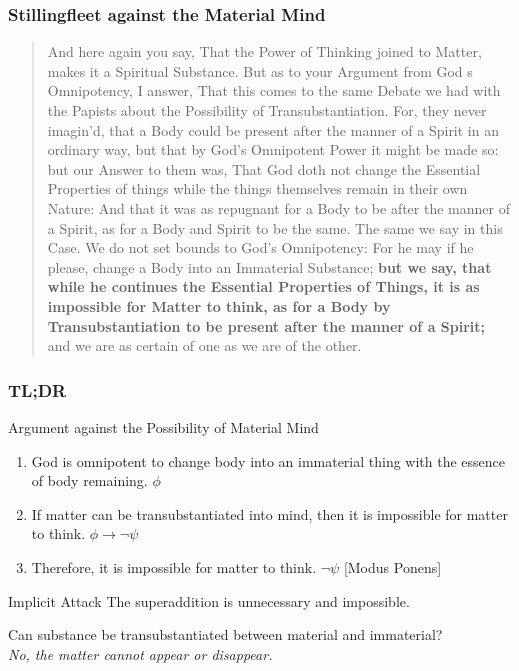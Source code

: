 \documentclass{beamer}
\begin{document}
\begin{frame}
    \frametitle{Stillingfleet against the Material Mind}
    \begin{small}
    \begin{quote}
    And here again you say, That the Power of Thinking joined to Matter, makes it a Spiritual Substance. But as to your Argument from God s Omnipotency, I answer, That this comes to the same Debate we had with the Papists about the Possibility of Transubstantiation. For, they never imagin'd, that a Body could be present after the manner of a Spirit in an ordinary way, but that by God's Omnipotent Power it might be made so: but our Answer to them was, That God doth not change the Essential Properties of things while the things themselves remain in their own Nature: And that it was as repugnant for a Body to be after the manner of a Spirit, as for a Body and Spirit to be the same. The same we say in this Case. We do not set bounds to God's Omnipotency: For he may if he please, change a Body into an Immaterial Substance; \textbf{but we say, that while he continues the Essential Properties of Things, it is as impossible for Matter to think, as for a Body by Transubstantiation to be present after the manner of a Spirit;} and we are as certain of one as we are of the other. \cite{stillingfleet-1698}
    \end{quote}
    \end{small}
\end{frame}

\begin{frame}
    \frametitle{TL;DR}
    \begin{block}{Argument against the Possibility of Material Mind}
        \begin{enumerate}
            \item God is omnipotent to change body into an immaterial thing with the essence of body remaining. $\phi$
            \item If matter can be transubstantiated into mind, then it is impossible for matter to think. $\phi \rightarrow \neg \psi$
            \item Therefore, it is impossible for matter to think. $\neg \psi$ [Modus Ponens]
        \end{enumerate}
    \end{block}
    \begin{block}{Implicit Attack}
        The superaddition is unnecessary and impossible.
    \end{block}
    Can substance be transubstantiated between material and immaterial? \\
    \emph{No, the matter cannot appear or disappear.}
\end{frame}
\end{document}
